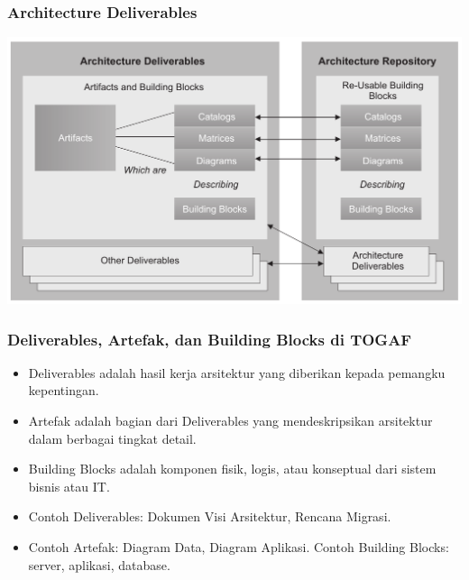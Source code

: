 \documentclass{beamer}
\begin{document}
	{
		\begin{frame}
			\frametitle{Architecture Deliverables}
			\begin{center}
				\includegraphics[width=.95\textwidth]{../figures/architecture_deliverables}
			\end{center}
		\end{frame}
	}
	
	\begin{frame}
		\frametitle{Deliverables, Artefak, dan Building Blocks di TOGAF}
		\begin{itemize}
			\item Deliverables adalah hasil kerja arsitektur yang diberikan kepada pemangku kepentingan.
			\item Artefak adalah bagian dari Deliverables yang mendeskripsikan arsitektur dalam berbagai tingkat detail.
			\item Building Blocks adalah komponen fisik, logis, atau konseptual dari sistem bisnis atau IT.
			\item Contoh Deliverables: Dokumen Visi Arsitektur, Rencana Migrasi.
			\item Contoh Artefak: Diagram Data, Diagram Aplikasi. Contoh Building Blocks: server, aplikasi, database.
		\end{itemize}
	\end{frame}
	
\end{document}
